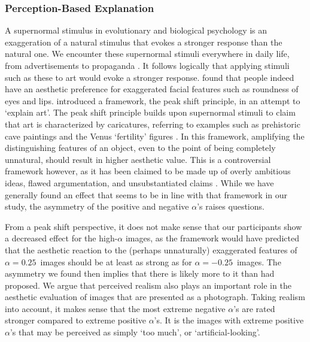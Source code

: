 \documentclass[../main.tex]{subfiles}
\begin{document}
\subsubsection{Perception-Based Explanation}
A supernormal stimulus in evolutionary and biological psychology is an exaggeration of a natural stimulus that evokes a stronger response than the natural one. We encounter these supernormal stimuli everywhere in daily life, from advertisements to propaganda \parencite{barrett2010supernormal}. It follows logically that applying stimuli such as these to art would evoke a stronger response. \textcite{costa2006aesthetic} found that people indeed have an aesthetic preference for exaggerated facial features such as roundness of eyes and lips. \textcite{ramachandran1999science} introduced a framework, the peak shift principle, in an attempt to `explain art'. The peak shift principle builds upon supernormal stimuli to claim that art is characterized by caricatures, referring to examples such as prehistoric cave paintings and the Venus `fertility' figures \parencite{ramachandran1999science}. In this framework, amplifying the distinguishing features of an object, even to the point of being completely unnatural, should result in higher aesthetic value. This is a controversial framework however, as it has been claimed to be made up of overly ambitious ideas, flawed argumentation, and unsubstantiated claims \parencite{hyman2010art}. While we have generally found an effect that seems to be in line with that framework in our study, the asymmetry of the positive and negative $\alpha$'s raises questions. 

From a peak shift perspective, it does not make sense that our participants show a decreased effect for the high-$\alpha$ images, as the framework would have predicted that the aesthetic reaction to the (perhaps unnaturally) exaggerated features of $\alpha=0.25$~images should be at least as strong as for $\alpha=-0.25$~images. The asymmetry we found then implies that there is likely more to it than \textcite{ramachandran1999science} had proposed. We argue that perceived realism also plays an important role in the aesthetic evaluation of images that are presented as a photograph. Taking realism into account, it makes sense that the most extreme negative $\alpha$'s are rated stronger compared to extreme positive $\alpha$'s. It is the images with extreme positive $\alpha$'s that may be perceived as simply `too much', or `artificial-looking'.
\end{document}
